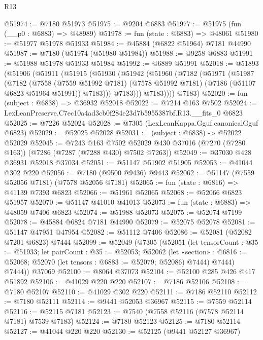 \begin{lexlean}{R13}
\begin{coremodule}
@51974 := @7180 @51973
@51975 := @9204 @6883
@51977 := @51975 (fun (__p0 : @6883) => @48989)
@51978 := fun (state : @6883) => @48061
@51980 := @51977 @51978 @51933
@51984 := @45884 (@6822 @51964) @7181 @44990
@51987 := @7180 (@51974 (@51980 @51984))
@51988 := @9258 @6883
@51991 := @51988 @51978 @51933 @51984
@51992 := @6889 @51991
@52018 := @51893
    (@51906
      (@51911
        (@51915
          (@51930
            (@51942
              (@51960
                (@7182
                  (@51971
                    (@51987
                      (@7182
                        (@7558
                          (@7559 @51992 @7181)
                          (@7578 @51992 @7181)
                          (@7186 (@51107 @6823 @51964 @51991))
                          @7183)))
                    @7183)))
              @7183))))
      @7183)
@52020 := fun (subject : @6838) => @36932 @52018
@52022 := @7214 @163 @7502
@52024 := LexLeanPreserve.C7ec10a4ad3cb0f284e23d7b5955387bf.R13.__fits_0 @6823
@52025 := @7226 @52024
@52028 := @7305 (LexLeanKappa.Gguf.canonicalGguf @6823)
@52029 := @52025 @52028
@52031 := (subject : @6838) -> @52022 @52029
@52045 := @7243
    @163
    @7502
    @52029
    @430
    @37016
    (@7270 (@7280 @163))
    (@7286 (@7287 (@7288 @430) @7502 @7263))
@52049 := @37030 @428 @36931 @52018 @37034
@52051 := @51147 @51902 @51905
@52053 := @41044 @302 @220
@52056 := @7180 (@9500 @9436) @9443
@52062 := @51147 (@7559 @52056 @7181) (@7578 @52056 @7181)
@52065 := fun (state : @6816) => @41139 @7393 @6823
@52066 := @51961 @52065
@52068 := @52066 @6823 @51957
@52070 := @51147 @41010 @41013
@52073 := fun (state : @6883) => @48059 @7406 @6823
@52074 := @51988 @52073
@52075 := @52074 @7199
@52078 := @45884 @6824 @7181 @44990
@52079 := @52075 @52078
@52081 := @51147 @47951 @47954
@52082 := @51112 @7406
@52086 := @52081 (@52082 @7201 @6823) @7444
@52099 := @52049
    (@7305
      (@52051
        (let tensorCount : @35 := @51933;
        let pairCount : @35 := @52053;
        @52062
          (let «section» : @6816 := @52068; @52070 (let tensors : @6883 := @52079; @52086) @7444)
          @7444)
        @7444))
    @37069
@52100 := @8064 @37073
@52104 := @52100 @285 @426 @417 @51892
@52106 := @41029 @220 @220
@52107 := @7186 @52106
@52108 := @7180 @52107
@52110 := @41029 @302 @220
@52111 := @7186 @52110
@52112 := @7180 @52111
@52114 := @9441 @52053 @36967
@52115 := @7559 @52114
@52116 := @52115 @7181
@52123 := @7540 (@7558 @52116 (@7578 @52114 @7181) @7539 @7183)
@52124 := @7180 @52123
@52125 := @7180 @52114
@52127 := @41044 @220 @220
@52130 := @52125 (@9441 @52127 @36967)

\end{coremodule}
\end{lexlean}
